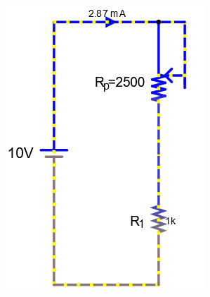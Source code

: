 \documentclass[a4paper]{article}
\begin{document}
\begin{figure}[H]
    \begin{subfigure}{0.333\textwidth}
        \includegraphics[width=.9\linewidth]{amp10}
    \end{subfigure}
    \begin{subfigure}{0.333\textwidth}

\end{subfigure}
\end{figure}
\end{document}
